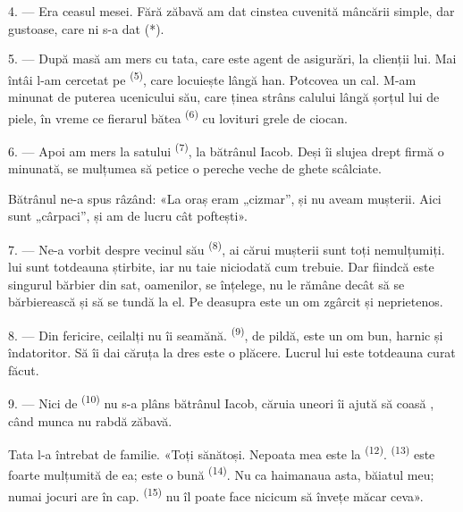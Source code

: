 4. --- Era ceasul mesei. Fără zăbavă am dat cinstea cuvenită mâncării simple, dar
gustoase, care ni s-a dat (*).

\VUsaut{3.0mm}

5. --- După masă am mers cu tata, care este agent de asigurări, la clienții lui.
Mai întâi l-am cercetat pe  \textsuperscript{(5)}, care locuiește
lângă han. Potcovea un cal. M-am minunat de puterea ucenicului său, care ținea
strâns  calului lângă șorțul lui de piele, în vreme ce fierarul
bătea  \textsuperscript{(6)} cu lovituri grele de ciocan.

6. --- Apoi am mers la  satului \textsuperscript{(7)}, la
bătrânul Iacob. Deși îi slujea drept firmă o  minunată, se
mulțumea să petice o pereche veche de ghete scâlciate.

Bătrânul ne-a spus râzând: «La oraș eram „cizmar”, și nu aveam mușterii. Aici sunt
„cârpaci”, și am de lucru cât poftești».

7. --- Ne-a vorbit despre vecinul său  \textsuperscript{(8)}, ai
cărui mușterii sunt toți nemulțumiți.  lui sunt totdeauna
știrbite, iar  nu taie niciodată cum trebuie. Dar fiindcă este
singurul bărbier din sat, oamenilor, se înțelege, nu le rămâne decât să se
bărbierească și să se tundă la el. Pe deasupra este un om zgârcit și neprietenos.

8. --- Din fericire, ceilalți  nu îi seamănă. 
\textsuperscript{(9)}, de pildă, este un om bun, harnic și îndatoritor. Să îi dai
căruța la dres este o plăcere. Lucrul lui este totdeauna curat făcut.

9. --- Nici de  \textsuperscript{(10)} nu s-a plâns bătrânul Iacob,
căruia uneori îi ajută să coasă , când munca nu rabdă zăbavă.

Tata l-a întrebat de familie. «Toți sănătoși. Nepoata mea este la 
\textsuperscript{(12)}.  \textsuperscript{(13)} este foarte
mulțumită de ea; este o  bună \textsuperscript{(14)}. Nu ca
haimanaua asta, băiatul meu; numai jocuri are în cap. 
\textsuperscript{(15)} nu îl poate face nicicum să învețe măcar ceva».

\VUsaut{3.0mm}
\VUsaut{3.0mm}

